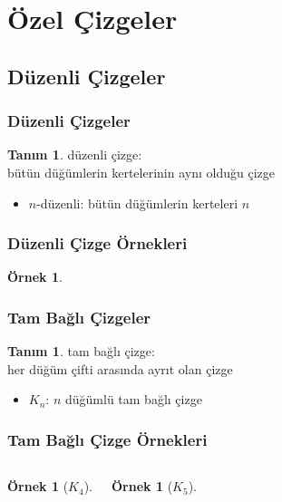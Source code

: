 \documentclass[dvipsnames]{beamer}
\theoremstyle{definition}
\newtheorem{tanim}[theorem]{Tanım}
\theoremstyle{example}
\newtheorem{ornek}[theorem]{Örnek}
\theoremstyle{plain}
\begin{document}
\section{Özel Çizgeler}

\subsection{Düzenli Çizgeler}

\begin{frame}
  \frametitle{Düzenli Çizgeler}

  \begin{tanim}
    \alert{düzenli çizge}:\\
    bütün düğümlerin kertelerinin aynı olduğu çizge

    \begin{itemize}
      \item $n$-düzenli: bütün düğümlerin kerteleri $n$
    \end{itemize}
  \end{tanim}
\end{frame}

\begin{frame}
  \frametitle{Düzenli Çizge Örnekleri}

  \begin{ornek}
    \begin{center}
    \end{center}
  \end{ornek}
\end{frame}

\begin{frame}
  \frametitle{Tam Bağlı Çizgeler}

  \begin{tanim}
    \alert{tam bağlı çizge}:\\
    her düğüm çifti arasında ayrıt olan çizge

    \begin{itemize}
      \item $K_n$: $n$ düğümlü tam bağlı çizge
    \end{itemize}
  \end{tanim}
\end{frame}

\begin{frame}
  \frametitle{Tam Bağlı Çizge Örnekleri}

  \begin{columns}
    \begin{ornek}[$K_4$]
      \begin{center}
      \end{center}
    \end{ornek}

    \begin{ornek}[$K_5$]
      \begin{center}
      \end{center}
    \end{ornek}
  \end{columns}
\end{frame}
\end{document}
